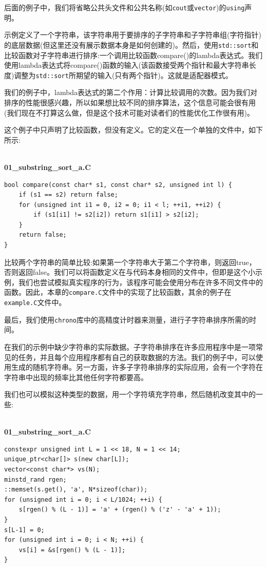 后面的例子中，我们将省略公共头文件和公共名称(如\texttt{cout}或\texttt{vector})的\texttt{using}声明。

示例定义了一个字符串，该字符串用于要排序的子字符串和子字符串组(字符指针)的底层数据(但这里还没有展示数据本身是如何创建的)。然后，使用\texttt{std::sort}和比较函数对子字符串进行排序:一个调用比较函数compare()的lambda表达式。我们使用lambda表达式将compare()函数的输入(该函数接受两个指针和最大字符串长度)调整为\texttt{std::sort}所期望的输入(只有两个指针)。这就是适配器模式。

我们的例子中，lambda表达式的第二个作用：计算比较调用的次数。因为我们对排序的性能很感兴趣，所以如果想比较不同的排序算法，这个信息可能会很有用(我们现在不打算这么做，但是这个技术可能对读者们的性能优化工作很有用)。

这个例子中只声明了比较函数，但没有定义。它的定义在一个单独的文件中，如下所示:


\hspace*{\fill} \\ %
\noindent
\textbf{01\_substring\_sort\_a.C}
\begin{lstlisting}[style=styleCXX]
bool compare(const char* s1, const char* s2, unsigned int l) {
	if (s1 == s2) return false;
	for (unsigned int i1 = 0, i2 = 0; i1 < l; ++i1, ++i2) {
		if (s1[i1] != s2[i2]) return s1[i1] > s2[i2];
	}
	return false;
}
\end{lstlisting}

比较两个字符串的简单比较:如果第一个字符串大于第二个字符串，则返回true，否则返回false。我们可以将函数定义在与代码本身相同的文件中，但即是这个小示例，我们也尝试模拟真实程序的行为，该程序可能会使用分布在许多不同文件中的函数。因此，本章的\texttt{compare.C}文件中的实现了比较函数，其余的例子在\texttt{example.C}文件中。

最后，我们使用\texttt{chrono}库中的高精度计时器来测量，进行子字符串排序所需的时间。

在我们的示例中缺少字符串的实际数据。子字符串排序在许多应用程序中是一项常见的任务，并且每个应用程序都有自己的获取数据的方法。我们的例子中，可以使用生成的随机字符串。另一方面，许多子字符串排序的实际应用，会有一个字符在字符串中出现的频率比其他任何字符都要高。

我们也可以模拟这种类型的数据，用一个字符填充字符串，然后随机改变其中的一些:

\hspace*{\fill} \\ %
\noindent
\textbf{01\_substring\_sort\_a.C}
\begin{lstlisting}[style=styleCXX]
constexpr unsigned int L = 1 << 18, N = 1 << 14;
unique_ptr<char[]> s(new char[L]);
vector<const char*> vs(N);
minstd_rand rgen;
::memset(s.get(), 'a', N*sizeof(char));
for (unsigned int i = 0; i < L/1024; ++i) {
	s[rgen() % (L - 1)] = 'a' + (rgen() % ('z' - 'a' + 1));
}
s[L-1] = 0;
for (unsigned int i = 0; i < N; ++i) {
	vs[i] = &s[rgen() % (L - 1)];
}
\end{lstlisting}

